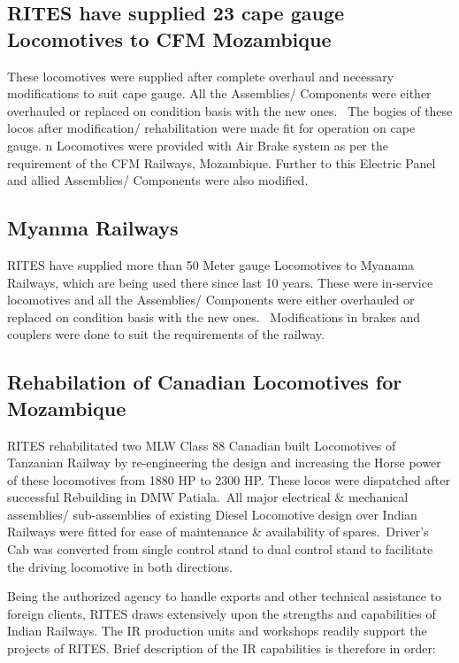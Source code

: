 \subsection{RITES have supplied 23 cape gauge Locomotives to CFM Mozambique}
These locomotives were supplied after complete overhaul and necessary modifications to suit cape gauge. All the
Assemblies/ Components were either overhauled or replaced on condition basis with the new ones. \ The bogies of these
locos after modification/ rehabilitation were made fit for operation on cape gauge. n Locomotives were provided with
Air Brake system as per the requirement of the CFM Railways, Mozambique. Further to this Electric Panel and allied
Assemblies/ Components were also modified.


\subsection{Myanma Railways}
RITES have supplied more than 50 Meter gauge Locomotives to Myanama Railways, which are being used there since
last 10 years. These were in-service locomotives and all the Assemblies/ Components were either overhauled or replaced
on condition basis with the new ones. \ Modifications in brakes and couplers were done to suit the requirements of the
railway.


\bigskip


\subsection{Rehabilation of Canadian Locomotives for Mozambique}
RITES rehabilitated two MLW Class 88 Canadian built Locomotives of Tanzanian Railway by re-engineering the
design and increasing the Horse power of these locomotives from 1880 HP to 2300 HP. These locos were dispatched after
successful Rebuilding in DMW Patiala.~All major electrical \& mechanical assemblies/ sub-assemblies of existing Diesel
Locomotive design over Indian Railways were fitted for ease of maintenance \& availability of spares.~Driver's Cab was
converted from single control stand to dual control stand to facilitate the driving locomotive in both directions.
\bigskip

 Being the authorized agency to handle exports and other technical assistance to foreign clients,
RITES draws extensively upon the strengths and capabilities of Indian Railways. The IR production units and workshops
readily support the projects of RITES. Brief description of the IR capabilities is therefore in order:

